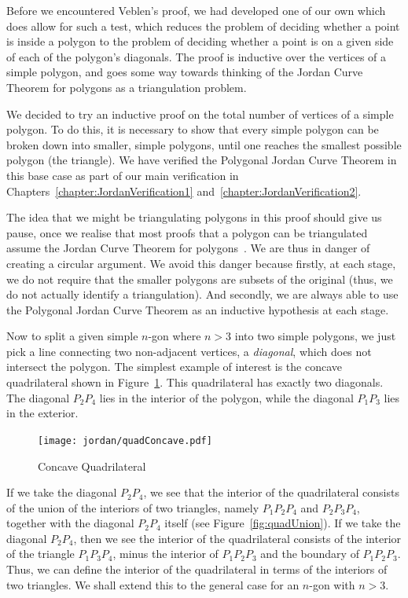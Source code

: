 Before we encountered Veblen's proof, we had developed one of our own which does allow for such a test, which reduces the problem of deciding whether a point is inside a polygon to the problem of deciding whether a point is on a given side of each of the polygon's diagonals. The proof is inductive over the vertices of a simple polygon, and goes some way towards thinking of the Jordan Curve Theorem for polygons as a triangulation problem.

We decided to try an inductive proof on the total number of vertices of a simple polygon. To do this, it is necessary to show that every simple polygon can be broken down into smaller, simple polygons, until one reaches the smallest possible polygon (the triangle). We have verified the Polygonal Jordan Curve Theorem in this base case as part of our main verification in Chapters~\ref{chapter:JordanVerification1} and~\ref{chapter:JordanVerification2}.

The idea that we might be triangulating polygons in this proof should give us pause, once we realise that most proofs that a polygon can be triangulated assume the Jordan Curve Theorem for polygons~\cite{PolygonsHaveEars}. We are thus in danger of creating a circular argument. We avoid this danger because firstly, at each stage, we do not require that the smaller polygons are subsets of the original (thus, we do not actually identify a triangulation). And secondly, we are always able to use the Polygonal Jordan Curve Theorem as an inductive hypothesis at each stage.

Now to split a given simple $n$-gon where $n>3$ into two simple polygons, we just pick a line connecting two non-adjacent vertices, a \emph{diagonal}, which does not intersect the polygon. The simplest example of interest is the concave quadrilateral shown in Figure~\ref{fig:quadConcave}. This quadrilateral has exactly two diagonals. The diagonal $P_2P_4$ lies in the interior of the polygon, while the diagonal $P_1P_3$ lies in the exterior.

\begin{figure}
  \centering
  \texttt{[image: jordan/quadConcave.pdf]}
  \caption{Concave Quadrilateral}
  \label{fig:quadConcave}
\end{figure}

If we take the diagonal $P_2P_4$, we see that the interior of the quadrilateral consists of the union of the interiors of two triangles, namely $P_1P_2P_4$ and $P_2P_3P_4$, together with the diagonal $P_2P_4$ itself (see Figure~\ref{fig:quadUnion}). If we take the diagonal $P_2P_4$, then we see the interior of the quadrilateral consists of the interior of the triangle $P_1P_3P_4$, minus the interior of $P_1P_2P_3$ and the boundary of $P_1P_2P_3$. Thus, we can define the interior of the quadrilateral in terms of the interiors of two triangles. We shall extend this to the general case for an $n$-gon with $n>3$.

